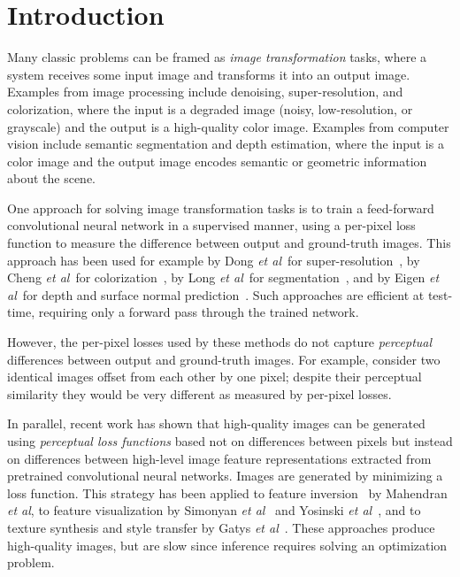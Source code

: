 \documentclass[runningheads]{llncs}
\newcommand{\etal}{\textit{et al}}
\begin{document}
\section{Introduction}
Many classic problems can be framed as \emph{image transformation} tasks, where a system
receives some input image and transforms it into an output image. Examples from image
processing include denoising, super-resolution, and
colorization, where the input is a degraded image (noisy, low-resolution, or grayscale)
and the output is a high-quality color image. Examples from computer vision
include semantic segmentation and depth estimation, where the input is a color
image and the output image encodes semantic or geometric information about the scene.

One approach for solving image transformation tasks is to train a feed-forward convolutional
neural network in a supervised manner, using a per-pixel loss function to measure the difference
between output and ground-truth images. This approach has been used for example by Dong \etal~for
super-resolution~\cite{dong2015image}, by Cheng \etal~for colorization~\cite{cheng2015deep}, by
Long \etal~for segmentation~\cite{long_shelhamer_fcn}, and by Eigen \etal~for depth and
surface normal prediction~\cite{eigen2014depth,eigen2015predicting}. Such approaches are
efficient at test-time, requiring only a forward pass through the trained network.

However, the per-pixel losses used by these methods do not capture
\emph{perceptual} differences between output and ground-truth images. For example, consider
two identical images offset from each other by one pixel; despite their perceptual similarity
they would be very different as measured by per-pixel losses.

In parallel, recent work has shown that high-quality images can be generated using
\emph{perceptual loss functions} based not on differences between pixels but instead on
differences between high-level image feature representations extracted from pretrained
convolutional neural networks. Images are generated by minimizing a loss function.
This strategy has been applied to feature inversion~\cite{mahendran15understanding}
by Mahendran \etal, to feature visualization by Simonyan \etal~\cite{simonyan2013deep}
and Yosinski \etal~\cite{yosinski2015understanding}, and to texture synthesis and style
transfer by Gatys \etal~\cite{Gatys2015b,gatys2015neural}.  These approaches produce
high-quality images, but are slow since inference requires solving an optimization problem.
\end{document}
